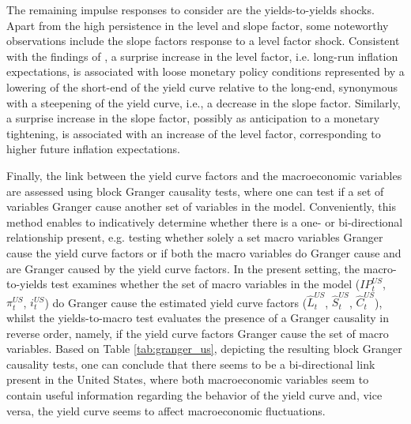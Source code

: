 The remaining impulse responses to consider are the yields-to-yields shocks. 
Apart from the high persistence in the level and slope factor, some noteworthy observations include the slope factors response to a level factor shock.
Consistent with the findings of \citet{diebold2006macroeconomy}, a surprise increase in the level factor, i.e. long-run inflation expectations, is associated with loose monetary policy conditions represented by a lowering of the short-end of the yield curve relative to the long-end, synonymous with a steepening of the yield curve, i.e., a decrease in the slope factor. 
Similarly, a surprise increase in the slope factor, possibly as anticipation to a monetary tightening, is associated with an increase of the level factor, corresponding to higher future inflation expectations. 





Finally, the link between the yield curve factors and the macroeconomic variables are assessed using block Granger causality tests, where one can test if a set of variables Granger cause another set of variables in the model. 
Conveniently, this method enables to indicatively determine whether there is a one- or bi-directional relationship present, e.g. testing whether solely a set macro variables Granger cause the yield curve factors or if both the macro variables do Granger cause and are Granger caused by the yield curve factors. 
In the present setting, the macro-to-yields test examines whether the set of macro variables in the model ($IP^{US}_{t}$, $\pi^{US}_{t}$, $i^{US}_{t}$) do Granger cause the estimated yield curve factors ($\hat{L}^{US}_{t}$, $\hat{S}^{US}_{t}$, $\hat{C}^{US}_{t}$), whilst the yields-to-macro test evaluates the presence of a Granger causality in reverse order, namely, if the yield curve factors Granger cause the set of macro variables. 
Based on Table \ref{tab:granger_us}, depicting the resulting block Granger causality tests, one can conclude that there seems to be a bi-directional link present in the United States, where both macroeconomic variables seem to contain useful information regarding the behavior of the yield curve and, vice versa, the yield curve seems to affect macroeconomic fluctuations. 

